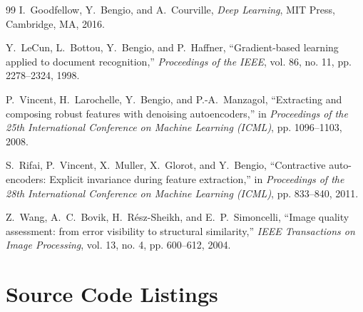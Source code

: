 \documentclass[12pt, a4paper]{article}
\begin{document}
\begin{thebibliography}{99}
I.~Goodfellow, Y.~Bengio, and A.~Courville, \textit{Deep Learning}, MIT Press, Cambridge, MA, 2016.

Y.~LeCun, L.~Bottou, Y.~Bengio, and P.~Haffner, ``Gradient-based learning applied to document recognition,'' \textit{Proceedings of the IEEE}, vol. 86, no. 11, pp. 2278--2324, 1998.

P.~Vincent, H.~Larochelle, Y.~Bengio, and P.-A.~Manzagol, ``Extracting and composing robust features with denoising autoencoders,'' in \textit{Proceedings of the 25th International Conference on Machine Learning (ICML)}, pp. 1096--1103, 2008.

S.~Rifai, P.~Vincent, X.~Muller, X.~Glorot, and Y.~Bengio, ``Contractive auto-encoders: Explicit invariance during feature extraction,'' in \textit{Proceedings of the 28th International Conference on Machine Learning (ICML)}, pp. 833--840, 2011.

Z.~Wang, A.~C.~Bovik, H.~R\'{e}sz-Sheikh, and E.~P.~Simoncelli, ``Image quality assessment: from error visibility to structural similarity,'' \textit{IEEE Transactions on Image Processing}, vol. 13, no. 4, pp. 600--612, 2004.
\end{thebibliography}

\newpage

\appendix
\section{Source Code Listings}
\end{document}
